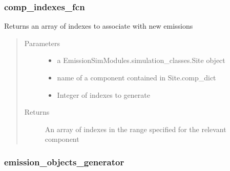 \documentclass[letterpaper,10pt,english]{sphinxmanual}
\begin{document}
\subsubsection{comp\_indexes\_fcn}
\label{\detokenize{index:comp-indexes-fcn}}

\begin{fulllineitems}
\label{\detokenize{index:feast.EmissionSimModules.emission_class_functions.comp_indexes_fcn}}
Returns an array of indexes to associate with new emissions
\begin{quote}\begin{description}
\item[{Parameters}] \leavevmode\begin{itemize}
\item {} 
 \textendash{} a EmissionSimModules.simulation\_classes.Site object

\item {} 
 \textendash{} name of a component contained in Site.comp\_dict

\item {} 
 \textendash{} Integer of indexes to generate

\end{itemize}

\item[{Returns}] \leavevmode
An array of indexes in the range specified for the relevant component

\end{description}\end{quote}

\end{fulllineitems}



\subsubsection{emission\_objects\_generator}
\label{\detokenize{index:emission-objects-generator}}
\end{document}
